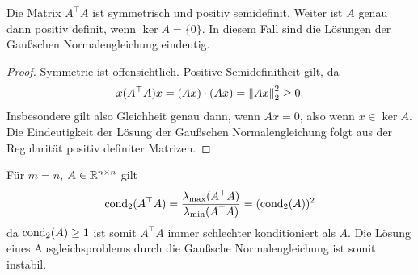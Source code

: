 \documentclass{report}
\begin{document}
\begin{lemma}
	Die Matrix $A^\top A$ ist symmetrisch und positiv semidefinit. Weiter ist $A$ genau dann positiv definit, wenn $\ker A = \{0\}$. In diesem Fall sind die Lösungen der Gaußschen Normalengleichung eindeutig.
\end{lemma}
\begin{proof}
	Symmetrie ist offensichtlich. Positive Semidefinitheit gilt, da
	\begin{align*}
		x(A^\top A) x = (Ax) \cdot (Ax) = \norm{Ax}_2^2 \geq 0.
	\end{align*}
	Insbesondere gilt also Gleichheit genau dann, wenn $Ax = 0$, also wenn $x \in \ker A$.
	\newpar
	Die Eindeutigkeit der Lösung der Gaußschen Normalengleichung folgt aus der Regularität positiv definiter Matrizen. 
\end{proof}
\noindent Für $m = n$, $A \in \mathbb{R}^{n \times n}$ gilt
\begin{align*}
	\textnormal{cond}_2 (A^\top A) = \frac{\lambda_{\max}(A^\top A)}{\lambda_{\min}(A^\top A)} = (\textnormal{cond}_2(A))^2
\end{align*}
da $\textnormal{cond}_2 (A) \geq 1$ ist somit $A^\top A$ immer schlechter konditioniert als $A$. Die Lösung eines Ausgleichsproblems durch die Gaußsche Normalengleichung ist somit instabil.
\end{document}
